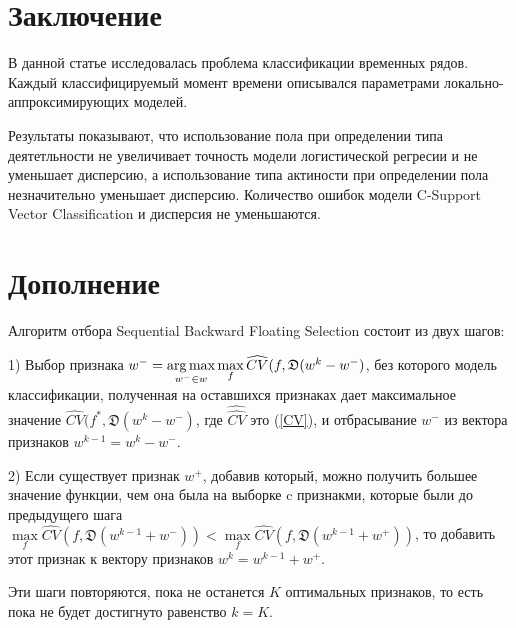 \documentclass[12pt, twoside]{article}
\begin{document}
\section{ Заключение}

В данной статье исследовалась проблема классификации временных рядов. Каждый классифицируемый момент времени описывался параметрами локально-аппроксимирующих моделей.

Результаты показывают, что использование пола при определении типа деятетльности не увеличивает точность модели логистической регресии и не уменьшает дисперсию, а использование типа актиности при определении пола незначительно уменьшает дисперсию. Количество ошибок модели C-Support Vector Classification и дисперсия не уменьшаются.


\section{ Дополнение}
\label{dop}

Алгоритм отбора Sequential Backward Floating Selection состоит из двух шагов:

1) Выбор признака $w^- = \argmax\limits_{w^- \in w} \max\limits_{f}\widehat{CV}(f, \mathfrak{D}(w^k-w^-)$, без которого модель классификации, полученная на оставшихся признаках дает максимальное значение $\widehat{CV}(f^*, \mathfrak{D}(w^k-w^-)$, где $\widehat{\hat{CV}}$ это (\ref{CV}), и отбрасывание $w^-$ из вектора признаков $w^{k-1}=w^k-w^-$.

2) Если существует признак $w^+$, добавив который, можно получить большее значение функции, чем она была на выборке c признакми, которые были до предыдущего шага $\max\limits_f \widehat{CV}(f, \mathfrak{D}(w^{k-1}+w^-))<\max\limits_f \widehat{CV}(f, \mathfrak{D}(w^{k-1}+w^+))$, то добавить этот признак к вектору признаков $w^k = w^{k-1}+w^+$.

Эти шаги повторяются, пока не останется $K$ оптимальных признаков, то есть пока не будет достигнуто равенство $k=K$.
\end{document}
